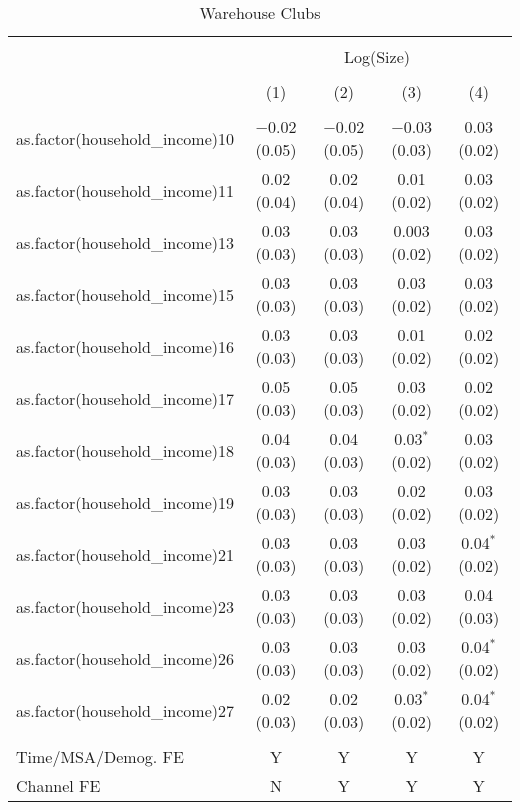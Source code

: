 
\begin{table}[!htbp] \centering 
  \caption{Warehouse Clubs} 
  \label{tab:packageSizeWarehouseappendix} 
\begin{tabular}{@{\extracolsep{5pt}}lcccc} 
\\[-1.8ex]\hline 
\hline \\[-1.8ex] 
 & \multicolumn{4}{c}{Log(Size)} \\ 
\\[-1.8ex] & (1) & (2) & (3) & (4)\\ 
\hline \\[-1.8ex] 
 as.factor(household\_income)10 & $-$0.02 (0.05) & $-$0.02 (0.05) & $-$0.03 (0.03) & 0.03 (0.02) \\ 
  as.factor(household\_income)11 & 0.02 (0.04) & 0.02 (0.04) & 0.01 (0.02) & 0.03 (0.02) \\ 
  as.factor(household\_income)13 & 0.03 (0.03) & 0.03 (0.03) & 0.003 (0.02) & 0.03 (0.02) \\ 
  as.factor(household\_income)15 & 0.03 (0.03) & 0.03 (0.03) & 0.03 (0.02) & 0.03 (0.02) \\ 
  as.factor(household\_income)16 & 0.03 (0.03) & 0.03 (0.03) & 0.01 (0.02) & 0.02 (0.02) \\ 
  as.factor(household\_income)17 & 0.05 (0.03) & 0.05 (0.03) & 0.03 (0.02) & 0.02 (0.02) \\ 
  as.factor(household\_income)18 & 0.04 (0.03) & 0.04 (0.03) & 0.03$^{*}$ (0.02) & 0.03 (0.02) \\ 
  as.factor(household\_income)19 & 0.03 (0.03) & 0.03 (0.03) & 0.02 (0.02) & 0.03 (0.02) \\ 
  as.factor(household\_income)21 & 0.03 (0.03) & 0.03 (0.03) & 0.03 (0.02) & 0.04$^{*}$ (0.02) \\ 
  as.factor(household\_income)23 & 0.03 (0.03) & 0.03 (0.03) & 0.03 (0.02) & 0.04 (0.03) \\ 
  as.factor(household\_income)26 & 0.03 (0.03) & 0.03 (0.03) & 0.03 (0.02) & 0.04$^{*}$ (0.02) \\ 
  as.factor(household\_income)27 & 0.02 (0.03) & 0.02 (0.03) & 0.03$^{*}$ (0.02) & 0.04$^{*}$ (0.02) \\ 
 \hline \\[-1.8ex] 
Time/MSA/Demog. FE & Y & Y & Y & Y \\ 
Channel FE & N & Y & Y & Y \\ 

\end{tabular}
\end{table}
